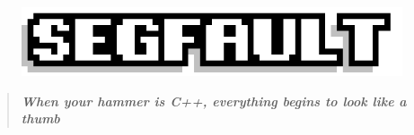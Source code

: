 \documentclass[9pt]{extarticle} %
\begin{document}

\pagestyle{fancy}
\fancyhf{}
\rhead{\today}
\addtolength\footskip{-15px}


\begin{figure}[H]
\centering\vspace{0.5cm}\includegraphics[width=0.8\linewidth]{imgs/segfault.png}
\end{figure}


\vspace{-15px}
\begin{quote}
\centering
\textbf{\textit{When your hammer is C++, everything begins to look like a thumb}}
\end{quote}
\vspace{10px}

\end{document}
